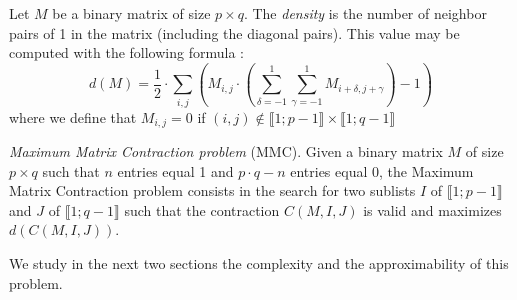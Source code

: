 \begin{definition}
	\label{def:density}
	Let $M$ be a binary matrix of size $p \times q$. The \emph{density} is the number of neighbor pairs of 1 in the matrix (including the diagonal pairs). This value may be computed with the following formula :
	$$ 
	d(M) = \frac{1}{2} \cdot \sum\limits_{i,j} \left( M_{i,j} \cdot \left(\sum\limits_{\delta = -1}^1 \sum\limits_{\gamma = -1}^1  M_{i+\delta,j+\gamma}\right) - 1 \right)
	$$
	where we define that $M_{i,j}=0$ if $(i,j) \notin \llbracket 1;p-1 \rrbracket \times \llbracket 1;q-1 \rrbracket$
\end{definition}

\begin{problem}\label{problem1}
	\emph{Maximum Matrix Contraction problem} (MMC). Given a binary matrix $M$ of size $p \times q$ such that $n$ entries equal 1 and $p \cdot q - n$ entries equal 0, the Maximum Matrix Contraction problem consists in the search for two sublists $I$ of $\llbracket 1;p-1 \rrbracket$ and $J$ of $\llbracket 1;q-1 \rrbracket$ such that the contraction $C(M,I,J)$ is valid and maximizes $d(C(M,I,J))$.
\end{problem}

We study in the next two sections the complexity and the approximability of this problem.

